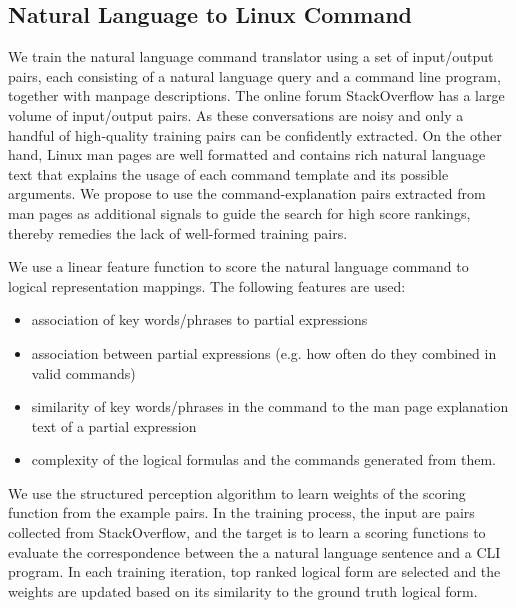 \subsection{Natural Language to Linux Command}
\label{subsec:parser}
We train the natural language command translator using a set of input/output pairs, each consisting of a natural language query and a command line program, together with manpage descriptions. The online forum StackOverflow has a large volume of input/output pairs. As these conversations are noisy and only a handful of high-quality training pairs can be confidently extracted. On the other hand, Linux man pages are well formatted and contains rich natural language text that explains the usage of each command template and its possible arguments. We propose to use the command-explanation pairs extracted from man pages as additional signals to guide the search for high score rankings, thereby remedies the lack of well-formed training pairs.

We use a linear feature function to score the natural language command to logical representation mappings. The following features are used:
\begin{itemize}\itemsep-1pt
	\item association of key words/phrases to partial expressions
	\item association between partial expressions (e.g. how often do they combined in valid commands)
	\item similarity of key words/phrases in the command to the man page explanation text of a partial expression
	\item complexity of the logical formulas and the commands generated from them.
\end{itemize}
We use the structured perception algorithm to learn weights of the scoring function from the example pairs. In the training process, the input are pairs collected from StackOverflow, and the target is to learn a scoring functions to evaluate the correspondence between the a natural language sentence and a CLI program. In each training iteration, top ranked logical form are selected and the weights are updated based on its similarity to the ground truth logical form. 
